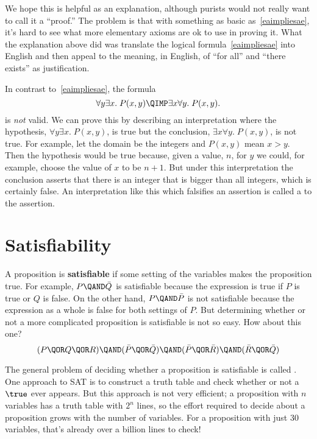 We hope this is helpful as an explanation, although purists would not
really want to call it a ``proof.''  The problem is that with something as basic
as~\eqref{eaimpliesae}, it's hard to see what more elementary axioms are
ok to use in proving it.  What the explanation above did was translate the
logical formula~\eqref{eaimpliesae} into English and then appeal to the
meaning, in English, of ``for all'' and ``there exists'' as justification.

In contrast to~\eqref{eaimpliesae}, the formula
\begin{equation}\label{aenotimplyea}
\forall y \exists x.\; P(x,y) \QIMP \exists x \forall y.\; P(x,y).
\end{equation}
is \emph{not} valid.  We can prove this by describing an
interpretation where the hypothesis, $\forall y \exists x.\; P(x,y)$, is
true but the conclusion, $\exists x \forall y.\; P(x,y)$, is not true.
For example, let the domain be the integers and $P(x,y)$ mean $x > y$.
Then the hypothesis would be true because, given a value, $n$, for $y$ we
could, for example, choose the value of $x$ to be $n+1$.  But under this
interpretation the conclusion asserts that there is an integer that is
bigger than all integers, which is certainly false.  An interpretation
like this which falsifies an assertion is called a  to
the assertion.

\section{Satisfiability}\label{SAT_sec}

A proposition is \textbf{satisfiable} if some setting of the variables
makes the proposition true.  For example, $P \QAND \bar{Q}$ is
satisfiable because the expression is true if $P$ is true or $Q$ is
false.  On the other hand, $P \QAND \bar{P}$ is not satisfiable because
the expression as a whole is false for both settings of $P$.  But
determining whether or not a more complicated proposition is satisfiable
is not so easy.  How about this one?
%
\[
(P \QOR Q \QOR R) \QAND (\bar P \QOR \bar Q)
                  \QAND (\bar P \QOR \bar R)
                  \QAND (\bar R \QOR \bar Q)
\]

The general problem of deciding whether a proposition is satisfiable
is called .  One approach to SAT is to construct a truth
table and check whether or not a $\true$ ever appears.  But this
approach is not very efficient; a proposition with $n$ variables has a
truth table with $2^n$ lines, so the effort required to decide about a
proposition grows  with the number of variables.
For a proposition with just 30 variables, that's already over a
billion lines to check!

